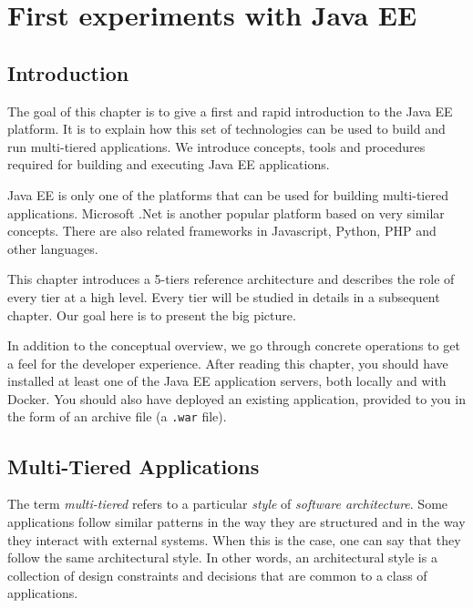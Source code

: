 \chapter{First experiments with Java EE}
\label{ch:first-steps}

\section{Introduction}

The goal of this chapter is to give a first and rapid introduction to the \ac{Java EE} platform. It is to explain how this set of technologies can be used to build and run multi-tiered applications. We introduce concepts, tools and procedures required for building and executing Java EE applications.


Java EE is only one of the platforms that can be used for building multi-tiered applications. Microsoft .Net is another popular platform based on very similar concepts. There are also related frameworks in Javascript, Python, PHP and other languages.

This chapter introduces a 5-tiers reference architecture and describes the role of every tier at a high level. Every tier will be studied in details in a subsequent chapter. Our goal here is to present the big picture.

In addition to the conceptual overview, we go through concrete operations to get a feel for the developer experience. After reading this chapter, you should have installed at least one of the Java EE application servers, both locally and with Docker. You should also have deployed an existing application, provided to you in the form of an archive file (a \texttt{.war} file). 

\section{Multi-Tiered Applications}

The term \emph{multi-tiered} refers to a particular \emph{style} of \emph{software architecture}. Some applications follow similar patterns in the way they are structured and in the way they interact with external systems. When this is the case, one can say that they follow the same architectural style. In other words, an architectural style is a collection of design constraints and decisions that are common to a class of applications. 

